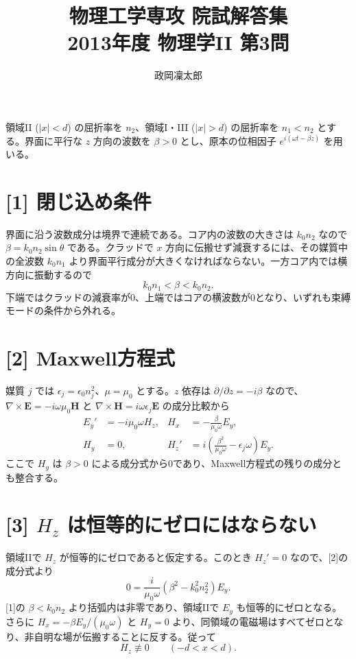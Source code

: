\documentclass[11pt,a4paper]{article}
\title{物理工学専攻 院試解答集\\2013年度 物理学II 第3問}
\author{政岡凜太郎}
\date{}
\begin{document}
\maketitle

領域II ($|x|<d$) の屈折率を $n_2$、領域I・III ($|x|>d$) の屈折率を $n_1<n_2$ とする。界面に平行な $z$ 方向の波数を $\beta>0$ とし、原本の位相因子 $e^{i(\omega t-\beta z)}$ を用いる。

\section*{[1] 閉じ込め条件}
界面に沿う波数成分は境界で連続である。コア内の波数の大きさは $k_0n_2$ なので $\beta=k_0n_2\sin\theta$ である。クラッドで $x$ 方向に伝搬せず減衰するには、その媒質中の全波数 $k_0n_1$ より界面平行成分が大きくなければならない。一方コア内では横方向に振動するので
\begin{equation}
  \boxed{k_0n_1<\beta<k_0n_2.}
\end{equation}
下端ではクラッドの減衰率が0、上端ではコアの横波数が0となり、いずれも束縛モードの条件から外れる。

\section*{[2] Maxwell方程式}
媒質 $j$ では $\epsilon_j=\epsilon_0n_j^2$、$\mu=\mu_0$ とする。$z$ 依存は $\partial/\partial z=-i\beta$ なので、$\nabla\times\boldsymbol E=-i\omega\mu_0\boldsymbol H$ と $\nabla\times\boldsymbol H=i\omega\epsilon_j\boldsymbol E$ の成分比較から
\begin{align}
  E_y'&=-i\mu_0\omega H_z, &
  H_x&=-\frac{\beta}{\mu_0\omega}E_y,\\
  H_y&=0, &
  H_z'&=i\left(\frac{\beta^2}{\mu_0\omega}-\epsilon_j\omega\right)E_y.
\end{align}
ここで $H_y$ は $\beta>0$ による成分式から0であり、Maxwell方程式の残りの成分とも整合する。

\section*{[3] $H_z$ は恒等的にゼロにはならない}
領域IIで $H_z$ が恒等的にゼロであると仮定する。このとき $H_z'=0$ なので、[2]の成分式より
\begin{equation}
 0=\frac{i}{\mu_0\omega}(\beta^2-k_0^2n_2^2)E_y.
\end{equation}
[1]の $\beta<k_0n_2$ より括弧内は非零であり、領域IIで $E_y$ も恒等的にゼロとなる。さらに $H_x=-\beta E_y/(\mu_0\omega)$ と $H_y=0$ より、同領域の電磁場はすべてゼロとなり、非自明な場が伝搬することに反する。従って
\begin{equation}
  \boxed{H_z\not\equiv0\qquad(-d<x<d).}
\end{equation}
\end{document}
